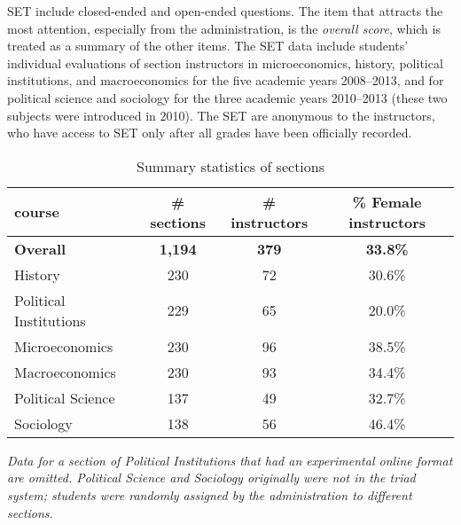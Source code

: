 \documentclass[12pt]{article}
\begin{document}
SET include closed-ended and open-ended questions.
The item that attracts the most attention, especially from the administration,
is the \emph{overall score}, 
which is treated as a summary of the other items.
The SET data include students' individual evaluations of section
instructors in microeconomics, history, political institutions, and 
macroeconomics for the five academic years 2008--2013, and for 
political science and sociology for the three academic years 2010--2013 
(these two subjects were introduced in 2010). 
The SET are anonymous to the instructors, who have access to SET only after 
all grades have been officially recorded.  

\begin{table}[htbp]
  \centering
  \footnotesize 
  \caption{Summary statistics of sections}
    \begin{tabular}{lccc}
    \toprule 
    course     & \# sections & \# instructors  & \% Female instructors  \\
   \midrule
  \textbf{Overall} &  \textbf{1,194} & \textbf{379}  &\textbf{33.8\%} \\
    History    &               230 &      72          &   30.6\% \\
    Political Institutions  &  229 &      65          &   20.0\% \\    
    Microeconomics   &         230 &      96          &   38.5\% \\
    Macroeconomics   &         230 &      93          &   34.4\% \\
    Political Science &       137 &      49          &   32.7\% \\
    Sociology   &              138 &      56          &   46.4\%    \\
    \bottomrule
    \end{tabular}%
 \label{tab:description}%
 
\textit{Data for a section of Political Institutions that 
had an experimental online format are omitted.
Political Science and Sociology originally were not in the triad system; 
students were randomly assigned by the administration to different sections.
} 

\end{table}%
\normalsize
\end{document}
